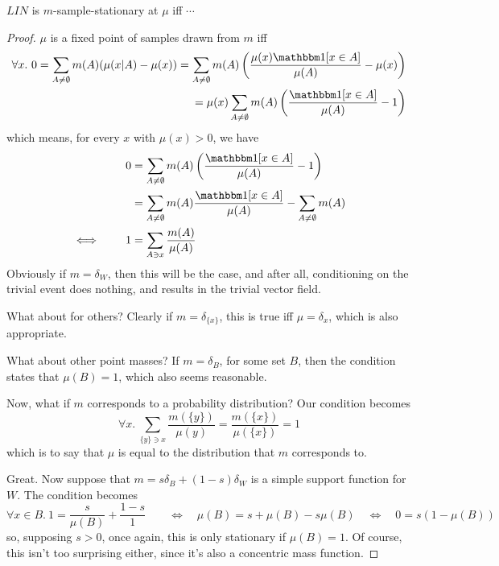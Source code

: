 \documentclass{article}
\begin{document}
\begin{conj}
    $\mathit{LIN}$
    is $m$-sample-stationary at $\mu$ iff $\cdots$
\end{conj}
\begin{proof}
    $\mu$ is a fixed point of samples drawn from $m$ iff
    \begin{align*}
        \forall x.~
        0 = \sum_{A \ne \emptyset} m(A) (\mu(x|A) - \mu(x)) 
        = \sum_{A \ne \emptyset} m(A) \left(
            \frac{\mu(x) \mathbbm1[x \in A]}{\mu(A)} - \mu(x) \right) \\
        = \mu(x) \sum_{A \ne \emptyset} m(A) \left(
            \frac{\mathbbm1[x \in A]}{\mu(A)} - 1 \right) \\
    \end{align*}
    which means, for every $x$ with $\mu(x) > 0$, we have
    \begin{align*}
        0 &= \sum_{A \ne \emptyset} m(A) \left( \frac{\mathbbm1[x \in A]}{\mu(A)} - 1 \right)  \\
          &= \sum_{A \ne \emptyset} m(A)\frac{\mathbbm1[x \in A]}{\mu(A)} - \sum_{A \ne \emptyset}m(A) \\
          \iff\qquad
          1 &=  \sum_{A \ni x}\frac{m(A)}{\mu(A)} \\
    \end{align*}
    Obviously if $m = \delta_W$, then this will be the case, and after all, conditioning on the trivial event does nothing, and results in the trivial vector field. 
    
    What about for others? Clearly if $m = \delta_{\{x\}}$, this is true iff $\mu = \delta_x$, which is also appropriate.
    
    What about other point masses? If $m = \delta_B$, for some set $B$, then the condition states that $\mu(B) = 1$, which also seems reasonable.
    
    Now, what if $m$ corresponds to a probability distribution? Our condition becomes
    \[
        \forall x.~ \sum_{\{y\} \ni x} \frac{m(\{y\})}{\mu(y)} = \frac{m(\{x\})}{\mu(\{x\})} = 1
    \]
    which is to say that $\mu$ is equal to the distribution that $m$ corresponds to.
    
    
    Great. Now suppose that $m = s \delta_B + (1-s) \delta_W$ is a simple support function for $W$.  The condition becomes
    \[
        \forall x \in B.~ 1= \frac{s}{\mu(B)} + \frac{1-s}{1} 
        \qquad\iff\quad
            \mu(B) = s + \mu(B) - s \mu(B)
        \quad\iff\quad
            0 = s (1 - \mu(B))
    \] 
    so, supposing $s > 0$, once again, this is only stationary if $\mu(B) = 1$. Of course, this isn't too surprising either, since it's also a concentric mass function.
    

\end{proof}
\end{document}
